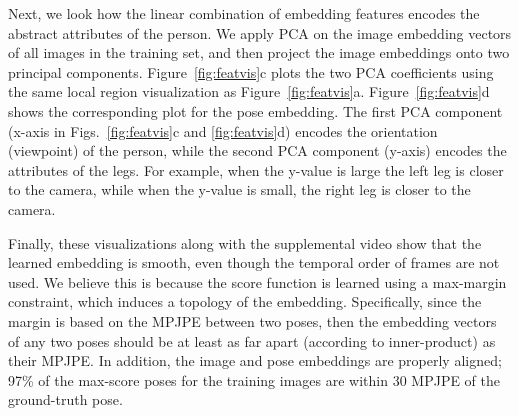 \documentclass[10pt,twocolumn,letterpaper]{article}
\begin{document}
%
%

% 

%
%
%
%
%
%
%

%
%
%
%
%

Next, we look how the linear combination of embedding features encodes the abstract attributes of the person.
We apply PCA on the image embedding vectors of all images in the training set, and then project the image embeddings onto two principal components.
Figure~\ref{fig:featvis}c plots the two PCA coefficients using the same local region visualization as Figure~\ref{fig:featvis}a.  Figure~\ref{fig:featvis}d shows the corresponding plot for the pose embedding.
%
The first PCA component (x-axis in Figs.~\ref{fig:featvis}c and \ref{fig:featvis}d) encodes the orientation (viewpoint) of the person, while 
the second PCA component (y-axis) encodes the attributes of the legs.  
For example, when the y-value is large the left leg is closer to the camera, while when the y-value is small, the right leg is closer to the camera.

Finally, these visualizations along with the supplemental video show that the learned embedding is smooth, even though the temporal order of frames are not used. We believe this is because the score function is learned using a max-margin constraint, which induces a topology of the embedding. Specifically, since the margin is based on the MPJPE between two poses, then the embedding vectors of any two poses should be at least as far apart (according to inner-product) as their MPJPE.
In addition, the  image and pose embeddings are properly aligned; 97\% of the max-score poses for the training images are within 30 MPJPE of the ground-truth pose.


%
%

%
%


% 
% 
% 
% 
%
  
%
%  
\end{document}
